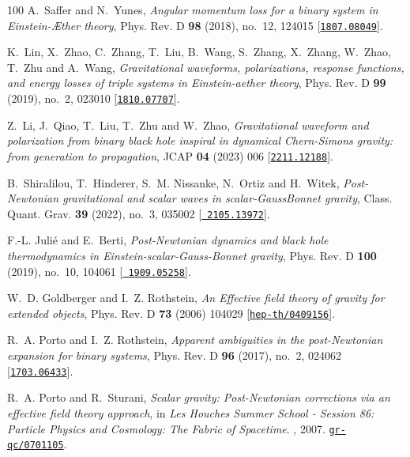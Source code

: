 \begin{thebibliography}{100}
A.~Saffer and N.~Yunes,  {\em {Angular momentum loss for a binary system in
  Einstein-\AE{}ther theory}}, Phys. Rev. D {\bf 98} (2018), no.~12, 124015
  [\href{http://www.arXiv.org/abs/1807.08049}{{\tt 1807.08049}}].

K.~Lin, X.~Zhao, C.~Zhang, T.~Liu, B.~Wang, S.~Zhang, X.~Zhang, W.~Zhao, T.~Zhu
  and A.~Wang,  {\em {Gravitational waveforms, polarizations, response
  functions, and energy losses of triple systems in Einstein-aether theory}},
  Phys. Rev. D {\bf 99} (2019), no.~2, 023010
  [\href{http://www.arXiv.org/abs/1810.07707}{{\tt 1810.07707}}].

Z.~Li, J.~Qiao, T.~Liu, T.~Zhu and W.~Zhao,  {\em {Gravitational waveform and
  polarization from binary black hole inspiral in dynamical Chern-Simons
  gravity: from generation to propagation}}, JCAP {\bf 04} (2023) 006
  [\href{http://www.arXiv.org/abs/2211.12188}{{\tt 2211.12188}}].

B.~Shiralilou, T.~Hinderer, S.~M. Nissanke, N.~Ortiz and H.~Witek,  {\em
  {Post-Newtonian gravitational and scalar waves in
  scalar-Gauss\textendash{}Bonnet gravity}}, Class. Quant. Grav. {\bf 39}
  (2022), no.~3, 035002 [\href{http://www.arXiv.org/abs/2105.13972}{{\tt
  2105.13972}}].

F.-L. Juli\'e and E.~Berti,  {\em {Post-Newtonian dynamics and black hole
  thermodynamics in Einstein-scalar-Gauss-Bonnet gravity}}, Phys. Rev. D {\bf
  100} (2019), no.~10, 104061 [\href{http://www.arXiv.org/abs/1909.05258}{{\tt
  1909.05258}}].

W.~D. Goldberger and I.~Z. Rothstein,  {\em {An Effective field theory of
  gravity for extended objects}}, Phys. Rev. D {\bf 73} (2006) 104029
  [\href{http://www.arXiv.org/abs/hep-th/0409156}{{\tt hep-th/0409156}}].

R.~A. Porto and I.~Z. Rothstein,  {\em {Apparent ambiguities in the
  post-Newtonian expansion for binary systems}}, Phys. Rev. D {\bf 96} (2017),
  no.~2, 024062 [\href{http://www.arXiv.org/abs/1703.06433}{{\tt 1703.06433}}].

R.~A. Porto and R.~Sturani,  {\em {Scalar gravity: Post-Newtonian corrections
  via an effective field theory approach}}, in {\em {Les Houches Summer School
  - Session 86: Particle Physics and Cosmology: The Fabric of Spacetime}}.
, 2007.
\newblock \href{http://www.arXiv.org/abs/gr-qc/0701105}{{\tt gr-qc/0701105}}.


\end{thebibliography}
